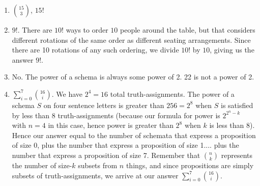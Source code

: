 \begin{mdframed}[linewidth=1]
\begin{enumerate}
    \item $\binom{15}{3}$, $15!$

    \item $9!$. There are $10!$ ways to order $10$ people around the table, but that considers different rotations of the same order as different seating arrangements. Since there are 10 rotations of any such ordering, we divide $10!$ by $10$, giving us the answer $9!$.

    \item No. The power of a schema is always some power of 2. 22 is not a power of 2. 

    \item $\sum_{i = 0}^7\binom{16}{i}$. We have $2^4 = 16$ total truth-assignments. The power of a schema $S$ on four sentence letters is greater than $256 = 2^8$ when $S$ is satisfied by less than $8$ truth-assignments (because our formula for power is $2^{2^n - k}$ with $n=4$ in this case, hence power is greater than $2^8$ when $k$ is less than 8). Hence our answer equal to the number of schemata that express a proposition of size 0, plus the number that express a proposition of size 1.... plus the number that express a proposition of size 7. Remember that $\binom{n}{k}$ represents the number of size-$k$ subsets from $n$ things, and since propositions are simply subsets of truth-assignments, we arrive at our answer $\sum_{i = 0}^7\binom{16}{i}$.

\end{enumerate}
\end{mdframed}